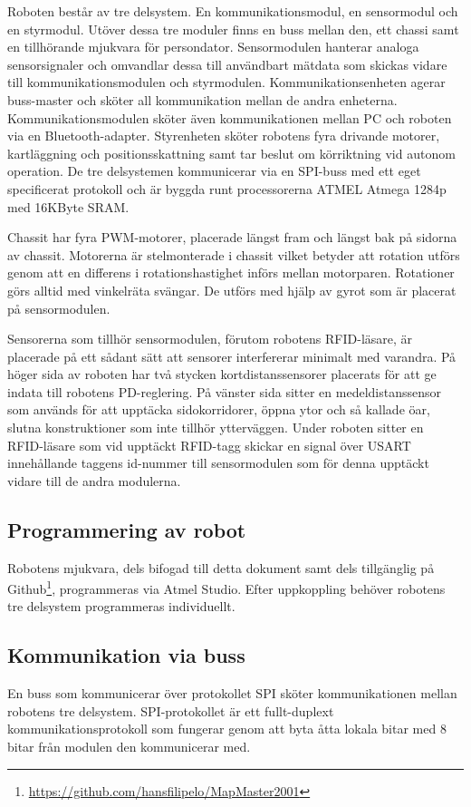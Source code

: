\documentclass[a4paper,12pt,fleqn]{article}
\begin{document}
Roboten består av tre delsystem. En kommunikationsmodul, en sensormodul och en styrmodul. Utöver dessa tre moduler finns en buss mellan den, ett chassi samt en tillhörande mjukvara för persondator. Sensormodulen hanterar analoga sensorsignaler och omvandlar dessa till användbart mätdata som skickas vidare till kommunikationsmodulen och styrmodulen. 
Kommunikationsenheten agerar buss-master och sköter all kommunikation mellan de andra enheterna. Kommunikationsmodulen sköter även kommunikationen mellan PC och roboten via en Bluetooth-adapter. Styrenheten sköter robotens fyra drivande motorer, kartläggning och positionsskattning samt tar beslut om körriktning vid autonom operation. 
De tre delsystemen kommunicerar via en SPI-buss med ett eget specificerat protokoll och är byggda runt processorerna ATMEL Atmega 1284p med 16KByte SRAM. 

Chassit har fyra PWM-motorer, placerade längst fram och längst bak på sidorna av chassit. Motorerna är stelmonterade i chassit vilket betyder att rotation utförs genom att en differens i rotationshastighet införs mellan motorparen. Rotationer görs alltid med vinkelräta svängar. De utförs med hjälp av gyrot som är placerat på sensormodulen. 

Sensorerna som tillhör sensormodulen, förutom robotens RFID-läsare, är placerade på ett sådant sätt att sensorer interfererar minimalt med varandra. På höger sida av roboten har två stycken kortdistanssensorer placerats för att ge indata till robotens PD-reglering. På vänster sida sitter en medeldistanssensor som används för att upptäcka sidokorridorer, öppna ytor och så kallade öar, slutna konstruktioner som inte tillhör ytterväggen. Under roboten sitter en RFID-läsare som vid upptäckt RFID-tagg skickar en signal över USART innehållande taggens id-nummer till sensormodulen som för denna upptäckt vidare till de andra modulerna.

\subsection{Programmering av robot}
Robotens mjukvara, dels bifogad till detta dokument samt dels tillgänglig på Github\footnote{\url{https://github.com/hansfilipelo/MapMaster2001}}, programmeras via Atmel Studio. Efter uppkoppling behöver robotens tre delsystem programmeras individuellt. 

\subsection{Kommunikation via buss}
En buss som kommunicerar över protokollet SPI sköter kommunikationen mellan robotens tre delsystem. SPI-protokollet är ett fullt-duplext kommunikationsprotokoll som fungerar genom att byta åtta lokala bitar med 8 bitar från modulen den kommunicerar med. 
\end{document}
